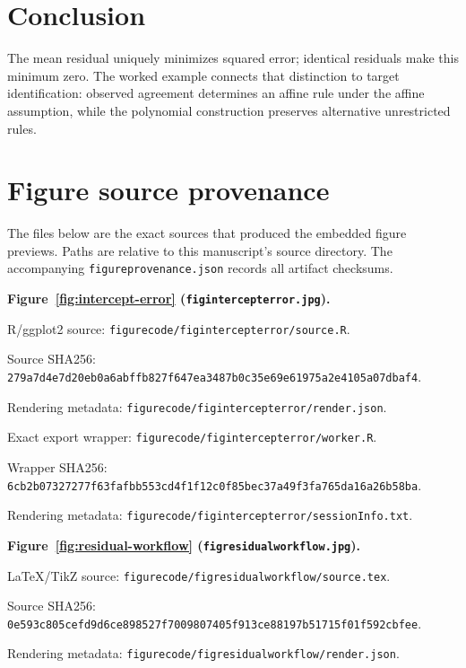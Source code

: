 \documentclass[11pt]{article}
\begin{document}
\section{Conclusion}

The mean residual uniquely minimizes squared error; identical residuals make this minimum zero. The worked example connects that distinction to target identification: observed agreement determines an affine rule under the affine assumption, while the polynomial construction preserves alternative unrestricted rules.

\clearpage
\section*{Figure source provenance}
The files below are the exact sources that produced the embedded figure previews. Paths are relative to this manuscript's source directory. The accompanying \texttt{figureprovenance.json} records all artifact checksums.\par
\medskip\noindent\textbf{Figure~\ref{fig:intercept-error} (\texttt{figintercepterror.jpg}).}\par
\noindent R/ggplot2 source: \texttt{figurecode/\allowbreak{}figintercepterror/\allowbreak{}source.R}.\par
\noindent Source SHA256: \texttt{279a7d4e\allowbreak{}7d20eb0a\allowbreak{}6abffb82\allowbreak{}7f647ea3\allowbreak{}487b0c35\allowbreak{}e69e6197\allowbreak{}5a2e4105\allowbreak{}a07dbaf4}.\par
\noindent Rendering metadata: \texttt{figurecode/\allowbreak{}figintercepterror/\allowbreak{}render.json}.\par
\noindent Exact export wrapper: \texttt{figurecode/\allowbreak{}figintercepterror/\allowbreak{}worker.R}.\par
\noindent Wrapper SHA256: \texttt{6cb2b073\allowbreak{}27277f63\allowbreak{}fafbb553\allowbreak{}cd4f1f12\allowbreak{}c0f85bec\allowbreak{}37a49f3f\allowbreak{}a765da16\allowbreak{}a26b58ba}.\par
\noindent Rendering metadata: \texttt{figurecode/\allowbreak{}figintercepterror/\allowbreak{}sessionInfo.txt}.\par
\medskip\noindent\textbf{Figure~\ref{fig:residual-workflow} (\texttt{figresidualworkflow.jpg}).}\par
\noindent LaTeX/TikZ source: \texttt{figurecode/\allowbreak{}figresidualworkflow/\allowbreak{}source.tex}.\par
\noindent Source SHA256: \texttt{0e593c80\allowbreak{}5cefd9d6\allowbreak{}ce898527\allowbreak{}f7009807\allowbreak{}405f913c\allowbreak{}e88197b5\allowbreak{}1715f01f\allowbreak{}592cbfee}.\par
\noindent Rendering metadata: \texttt{figurecode/\allowbreak{}figresidualworkflow/\allowbreak{}render.json}.\par
\end{document}
